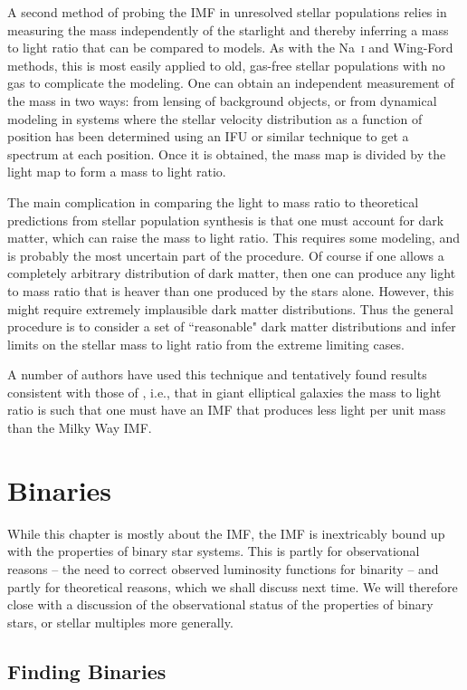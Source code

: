 A second method of probing the IMF in unresolved stellar populations relies in measuring the mass independently of the starlight and thereby inferring a mass to light ratio that can be compared to models. As with the Na~\textsc{i} and Wing-Ford methods, this is most easily applied to old, gas-free stellar populations with no gas to complicate the modeling. One can obtain an independent measurement of the mass in two ways: from lensing of background objects, or from dynamical modeling in systems where the stellar velocity distribution as a function of position has been determined using an IFU or similar technique to get a spectrum at each position. Once it is obtained, the mass map is divided by the light map to form a mass to light ratio.

The main complication in comparing the light to mass ratio to theoretical predictions from stellar population synthesis is that one must account for dark matter, which can raise the mass to light ratio. This requires some modeling, and is probably the most uncertain part of the procedure. Of course if one allows a completely arbitrary distribution of dark matter, then one can produce any light to mass ratio that is heaver than one produced by the stars alone. However, this might require extremely implausible dark matter distributions. Thus the general procedure is to consider a set of ``reasonable" dark matter distributions and infer limits on the stellar mass to light ratio from the extreme limiting cases.

A number of authors have used this technique and tentatively found results consistent with those of \citet{van-dokkum10a}, i.e., that in giant elliptical galaxies the mass to light ratio is such that one must have an IMF that produces less light per unit mass than the Milky Way IMF.

\section{Binaries}

While this chapter is mostly about the IMF, the IMF is inextricably bound up with the properties of binary star systems. This is partly for observational reasons -- the need to correct observed luminosity functions for binarity -- and partly for theoretical reasons, which we shall discuss next time. We will therefore close with a discussion of the observational status of the properties of binary stars, or stellar multiples more generally.

\subsection{Finding Binaries}

